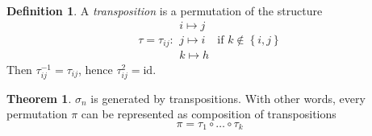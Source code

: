 \documentclass[a4paper,landscape,twocolumn]{article}
\newcommand\set[1]{\left\{#1\right\}}
\theoremstyle{definition}
\newtheorem{theorem}{Theorem}
\newtheorem{defi}{Definition}
\begin{document}
\begin{defi}
  A \emph{transposition} is a permutation of the structure
  \[
    \tau = \tau_{ij}:
    \begin{array}{c}
      i \mapsto j \\
      j \mapsto i \\
      k \mapsto h
    \end{array}
    \text{ if } k \notin \set{i,j}
  \]
  Then $\tau_{ij}^{-1} = \tau_{ij}$, hence $\tau_{ij}^2 = \text{id}$.
\end{defi}
\begin{theorem}
  \label{theorem-7.13}
  $\sigma_n$ is generated by transpositions.
  With other words, every permutation $\pi$ can be represented as composition of transpositions
  \[ \pi = \tau_1 \circ \ldots \circ \tau_k \]
\end{theorem}
\end{document}
